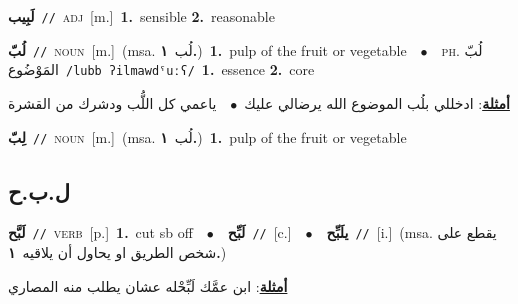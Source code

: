 \documentclass[10pt,a4paper,twoside]{article} %
\begin{document}
\begin{multicols}{2}
{\setlength\topsep{0pt}\textbf{\foreignlanguage{arabic}{لَبِيب}}\ {\color{gray}\texttt{//}\color{black}}\ \textsc{adj}\ [m.]\ \textbf{1.}~sensible  \textbf{2.}~reasonable\ } \vspace{2mm}

{\setlength\topsep{0pt}\textbf{\foreignlanguage{arabic}{لُبّ}}\ {\color{gray}\texttt{//}\color{black}}\ \textsc{noun}\ [m.]\ \color{gray}(msa. \foreignlanguage{arabic}{لُب}~\foreignlanguage{arabic}{\textbf{١.}})\color{black}\ \textbf{1.}~pulp of the fruit or vegetable\ \ $\bullet$\ \ \textsc{ph.} \color{gray} \foreignlanguage{arabic}{لُبّ المَوْضُوع}\color{black}\ {\color{gray}\texttt{/{\sffamily lubb ʔilmawdˤuːʕ}/}\color{black}}\ \textbf{1.}~essence  \textbf{2.}~core\  \begin{flushright}\color{gray}\foreignlanguage{arabic}{\textbf{\underline{\foreignlanguage{arabic}{أمثلة}}}: ادخللي بلُب الموضوع الله يرضالي عليك\ $\bullet$\ \  ياعمي كل اللُّب ودشرك من القشرة}\end{flushright}\color{black}} \vspace{2mm}

{\setlength\topsep{0pt}\textbf{\foreignlanguage{arabic}{لِبّ}}\ {\color{gray}\texttt{//}\color{black}}\ \textsc{noun}\ [m.]\ \color{gray}(msa. \foreignlanguage{arabic}{لُب}~\foreignlanguage{arabic}{\textbf{١.}})\color{black}\ \textbf{1.}~pulp of the fruit or vegetable\ } \vspace{2mm}

\vspace{-3mm}
\subsection*{\color{blue}\foreignlanguage{arabic}{ل.ب.ح}\color{blue}{}} 

{\setlength\topsep{0pt}\textbf{\foreignlanguage{arabic}{لَبَّح}}\ {\color{gray}\texttt{//}\color{black}}\ \textsc{verb}\ [p.]\ \textbf{1.}~cut sb off\ \ $\bullet$\ \ \setlength\topsep{0pt}\textbf{\foreignlanguage{arabic}{لَبِّح}}\ {\color{gray}\texttt{//}\color{black}}\ [c.]\ \ $\bullet$\ \ \setlength\topsep{0pt}\textbf{\foreignlanguage{arabic}{يلَبِّح}}\ {\color{gray}\texttt{//}\color{black}}\ [i.]\ \color{gray}(msa. \foreignlanguage{arabic}{يقطع على شخص الطريق او يحاول أن يلاقيه}~\foreignlanguage{arabic}{\textbf{١.}})\color{black}\  \begin{flushright}\color{gray}\foreignlanguage{arabic}{\textbf{\underline{\foreignlanguage{arabic}{أمثلة}}}: ابن عمَّك لَبِّحْله عشان يطلب منه المصاري}\end{flushright}\color{black}} \vspace{2mm}


\end{multicols}
\end{document}
